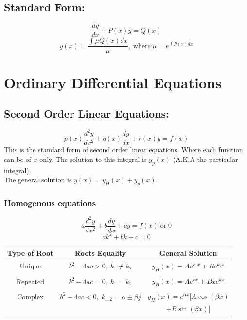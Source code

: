 \documentclass[a5paper]{article}
\begin{document}
	\subsection{Standard Form:}
	$$\frac{dy}{dx}+P(x)y=Q(x)$$
	$$y(x)=\frac{\int\mu Q(x)dx}{\mu},\;\text{where}\;\mu=e^{\int P(x)dx}$$

	\section{Ordinary Differential Equations}
	\subsection{Second Order Linear Equations:}
	$$p(x)\frac{d^{2}y}{dx^{2}}+q(x)\frac{dy}{dx}+r(x)y=f(x)$$
	This is the standard form of second order linear equations. Where each function can be of $x$ only. The solution to this integral is $y_{p}(x)$ (A.K.A the particular integral). \\
	The general solution is $y(x)=y_{H}(x)+y_{p}(x)$.
	\subsubsection{Homogenous equations}
	$$a\frac{d^{2}y}{dx^{2}}+b\frac{dy}{dx}+cy=f(x)\;\text{or}\;0$$
	$$ak^{2}+bk+c=0$$
	\begin{center}
	\begin{tabular}{ |c|c|c| }
		\hline
		Type of Root & Roots Equality & General Solution\\
		\hline
		Unique & $b^{2}-4ac>0,\;k_{1}\neq k_{2}$ & $y_{H}(x)=Ae^{k_{1}x}+Be^{k_{2}x}$\\
		       & & \\
		Repeated & $b^{2}-4ac=0,\;k_{1}=k_{2}$ & $y_{H}(x)=Ae^{kx}+Bxe^{kx}$\\
			 & & \\
		Complex & $b^{2}-4ac<0,\;k_{1,2}=\alpha\pm\beta j$ & $y_{H}(x)=e^{\alpha x}[A\cos{(\beta x)}$\\
			& & $+B\sin{(\beta x)}]$\\
		\hline
	\end{tabular}
	\end{center}
\end{document}

